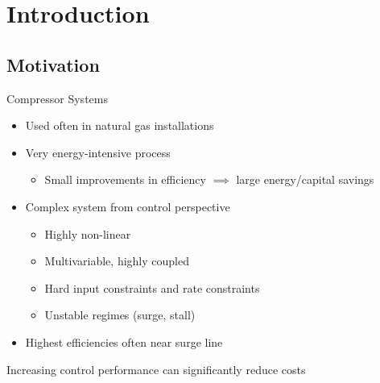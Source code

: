 \section{Introduction}

\subsection{Motivation}

\begin{frame}{Compressor Systems}
  \begin{itemize}
    \item Used often in natural gas installations
    \item Very energy-intensive process
      \begin{itemize}
        \item Small improvements in efficiency $\implies$ large energy/capital savings
      \end{itemize}
    \item Complex system from control perspective
      \begin{itemize}
        \item Highly non-linear
        \item Multivariable, highly coupled
        \item Hard input constraints and rate constraints
        \item Unstable regimes (surge, stall)
      \end{itemize}
    \item Highest efficiencies often near surge line
  \end{itemize}

  \vfill
  \pause
  \alert{\centering Increasing control performance can significantly reduce costs\\}
\end{frame}

